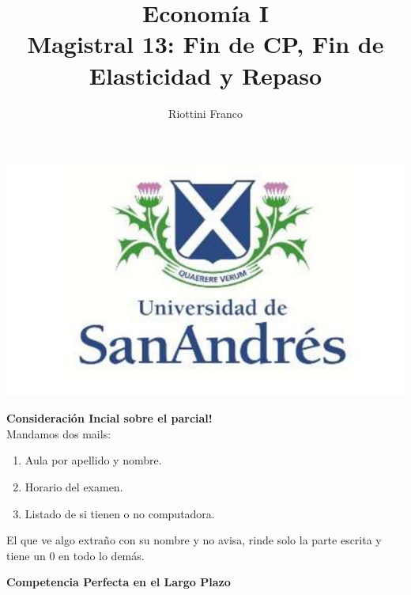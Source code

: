 \documentclass{beamer}
\title[Economía I]{Economía I \vspace{4mm}
\\ Magistral 13: Fin de CP, Fin de Elasticidad y Repaso}
\date{}
\author[Franco Riottini]{Riottini Franco}
\institute[]{Universidad de San Andrés}
\begin{document}
\begin{frame}
    \titlepage
    \centering
    \includegraphics[scale=0.2]{../Figures/logoUDESA.jpg} 
\end{frame}

\begin{frame}
    \centering
    \begin{boxB}
    \centering \Large \textbf{Consideración Incial sobre el parcial!} \\   
    Mandamos dos mails:
    \begin{enumerate}
        \item Aula por apellido y nombre.
        \item Horario del examen.
        \item Listado de si tienen o no computadora.
    \end{enumerate}
    El que ve algo extraño con su nombre y no avisa, rinde solo la parte escrita y tiene un $0$ en todo lo demás.
    \end{boxB}
\end{frame}

\begin{frame}
    \centering
    \begin{boxB}
    \centering \Large \textbf{Competencia Perfecta en el Largo Plazo} \\   
    \end{boxB}
\end{frame}
\end{document}
